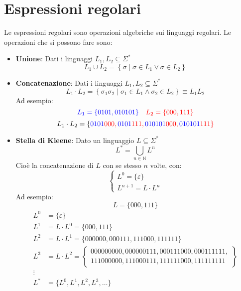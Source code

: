 \documentclass[a4paper]{article}
\begin{document}
\section{Espressioni regolari}
Le espressioni regolari sono operazioni algebriche sui linguaggi regolari.
Le operazioni che si possono fare sono:
\begin{itemize}
  \item \textbf{Unione}: Dati i linguaggi \( L_1, L_2 \subseteq \Sigma^* \) 
    \[
      L_1 \cup L_2 = \left\{ \sigma \;\left|\; \sigma \in L_1 \vee \sigma \in L_2 \right. \right\}
    \] 

  \item \textbf{Concatenazione}: Dati i linguaggi \( L_1, L_2 \subseteq \Sigma^* \) 
    \[
      L_1 \cdot L_2 = \left\{ \sigma_1\sigma_2 \;\left|\; \sigma_1 \in L_1 \wedge \sigma_2 \in L_2 \right. \right\}
      \equiv L_1 L_2
    \]
    Ad esempio:
    \[
      \color{blue}{L_1 = \{0101, 010101\}}
      \quad 
      \color{red}{L_2 = \{000, 111\}}
    \] 
    \[
      L_1 \cdot L_2 = \{\color{blue}{0101}\color{red}{000},
        \color{blue}{0101}\color{red}{111},
        \color{blue}{010101}\color{red}{000},
        \color{blue}{010101}\color{red}{111}
      \}
    \] 

  \item \textbf{Stella di Kleene}: Dato un linguaggio \( L \subseteq \Sigma^* \)
    \[
      L^* = \bigcup_{n \in \mathbb{N}} L^n
    \] 
    Cioè la concatenazione di \( L \) con se stesso \( n \) volte, con:
    \[
      \begin{cases}
        L^0 = \{\varepsilon\}\\
        L^{n+1} = L \cdot L^n
      \end{cases}
    \] 
    Ad esempio:
    \[
      L = \{000, 111\} 
    \] 
    \[
      \begin{aligned}
        L^0 &= \{\varepsilon\}\\
        L^1 &= L \cdot L^0 = \{000, 111\}\\
        L^2 &= L \cdot L^1 = \{000000, 000111, 111000, 111111\}\\
        L^3 &= L \cdot L^2 = \left\{\begin{array}{l}
          000000000, 000000111, 000111000, 000111111,\\
          111000000, 111000111, 111111000, 111111111
        \end{array}\right\}\\
        \vdots\\
        L^* &= \{L^0, L^1, L^2, L^3, \ldots\}\\
      \end{aligned}
    \] 


\end{itemize}
\end{document}

